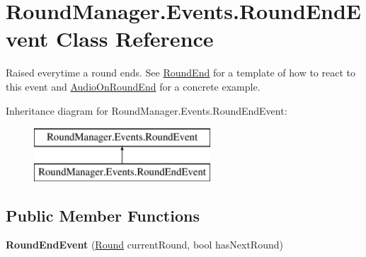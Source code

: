 \hypertarget{class_round_manager_1_1_events_1_1_round_end_event}{}\section{Round\+Manager.\+Events.\+Round\+End\+Event Class Reference}
\label{class_round_manager_1_1_events_1_1_round_end_event}


Raised everytime a round ends. See \hyperlink{class_round_manager_1_1_round_end}{Round\+End} for a template of how to react to this event and \hyperlink{class_round_manager_1_1_audio_on_round_end}{Audio\+On\+Round\+End} for a concrete example.  


Inheritance diagram for Round\+Manager.\+Events.\+Round\+End\+Event\+:\begin{figure}[H]
\begin{center}
\leavevmode
\includegraphics[height=2.000000cm]{class_round_manager_1_1_events_1_1_round_end_event}
\end{center}
\end{figure}
\subsection*{Public Member Functions}
\begin{DoxyCompactItemize}
\item 
\hypertarget{class_round_manager_1_1_events_1_1_round_end_event_a8116f1b26822e8f68c6dd7748a6d1617}{}{\bfseries Round\+End\+Event} (\hyperlink{class_round_manager_1_1_round}{Round} current\+Round, bool has\+Next\+Round)\label{class_round_manager_1_1_events_1_1_round_end_event_a8116f1b26822e8f68c6dd7748a6d1617}

\end{DoxyCompactItemize}
